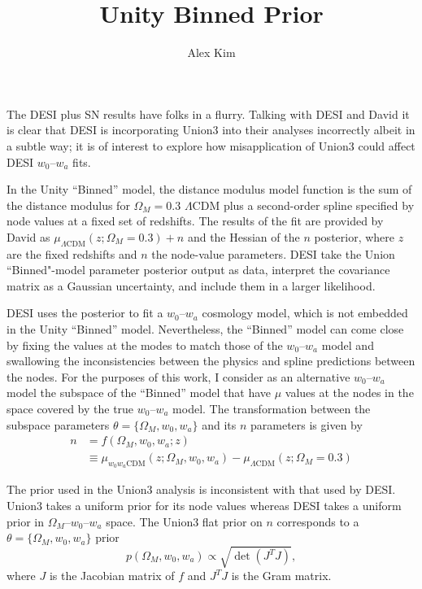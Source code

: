 \documentclass[11pt, oneside]{article}   	%
\title{Unity Binned Prior}
\author{Alex Kim}
\begin{document}
\maketitle

The DESI plus SN results have folks in a flurry.  Talking with DESI and David it is clear that DESI is incorporating Union3
into their analyses incorrectly albeit in a subtle way;  it is of interest to explore how misapplication
of Union3 could affect  DESI $w_0$--$w_a$  fits.

In the Unity ``Binned'' model, the distance modulus model function
is the sum of the distance modulus for $\Omega_M=0.3$  $\Lambda$CDM plus a second-order spline specified by node values
at a fixed set of redshifts.  The results of the fit are provided by David as
$\mu_{\Lambda \text{CDM}}(z;\Omega_M=0.3) + n$ and the  Hessian of the $n$ posterior,
where $z$ are the fixed redshifts and $n$ the node-value parameters.
DESI take the Union ``Binned"-model parameter posterior output as data, interpret the covariance matrix as a Gaussian uncertainty,
and include them in a larger likelihood. 

DESI uses the posterior to fit a $w_0$--$w_a$ cosmology model, which is not embedded in the Unity ``Binned'' model.  Nevertheless,
the ``Binned'' model can come close by fixing the values at the modes to match those of the $w_0$--$w_a$  model and swallowing the
inconsistencies between the physics and spline predictions between the nodes.  For the purposes of this work, I consider
as an alternative  $w_0$--$w_a$ model  the subspace
of the ``Binned'' model that have $\mu$ values at the nodes in the space  covered by the true $w_0$--$w_a$
model.  The transformation between the subspace parameters $\theta=\{\Omega_M, w_0, w_a\}$ and its $n$ parameters is given by
\begin{align}
	n &= f(\Omega_M, w_0, w_a; z) \\
	& \equiv \mu_{w_0 w_a \text{CDM}}(z;\Omega_M, w_0, w_a)  - \mu_{\Lambda \text{CDM}}(z;\Omega_M=0.3) 
\end{align}

The prior used in the Union3 analysis is inconsistent with that used by DESI.  Union3 takes a uniform prior for its node values whereas
DESI takes a uniform prior in $\Omega_M$--$w_0$--$w_a$ space.  The Union3 flat prior
on $n$  corresponds to a $\theta=\{\Omega_M, w_0, w_a\}$ prior
\begin{equation}
p(\Omega_M, w_0,w_a) \propto \sqrt{\det{\left(J^T J\right)}},
\end{equation}
where $J$ is the Jacobian matrix of $f$
and $J^TJ$ is the Gram matrix.
\end{document}
